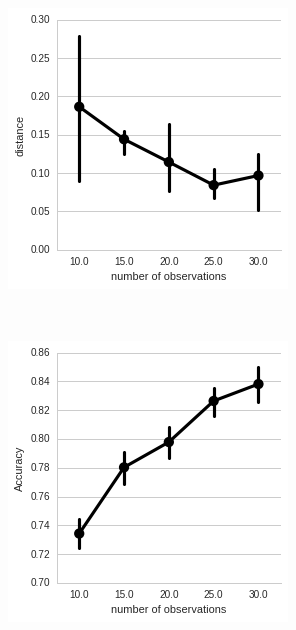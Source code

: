\begin{figure}
    \centering
    \begin{subfigure}[b]{0.4\textwidth}
        \includegraphics[width=\textwidth]{images/object_simulation_error.png}
        \caption{}
        \label{fig:object_simulation_distance}
    \end{subfigure}
    ~ %
      \qquad
    \begin{subfigure}[b]{0.4\textwidth}
        \includegraphics[width=\textwidth]{images/object_simulation_accuracy.png}

\end{subfigure}
\end{figure}
